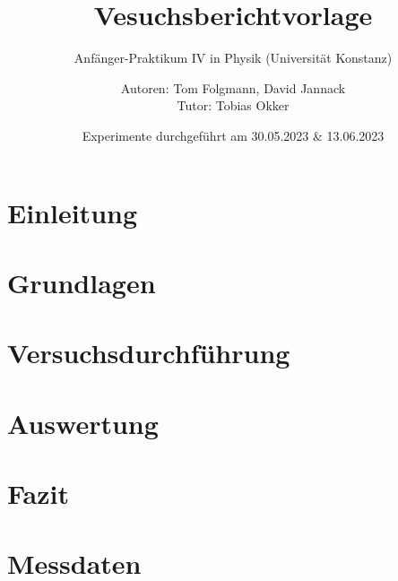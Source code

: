 \documentclass[
    oneside, 
    footinclude=off, 
    captions=tableheading, 
    DIV=12;usenames,
    dvipsnames
]{scrartcl}
\begin{document}
    \title{Vesuchsberichtvorlage}
    \subtitle{Anfänger-Praktikum IV in Physik (Universität Konstanz)}
    \author{Autoren: Tom Folgmann, David Jannack \\ \large{Tutor: Tobias Okker}}
    \date{Experimente durchgeführt am 30.05.2023 \& 13.06.2023}
    \maketitle
    \thispagestyle{empty}
    \section*{Einleitung}
        

    \newpage


    \tableofcontents
    \thispagestyle{empty}	
    \newpage
    \setcounter{page}{1}


\newpage
\section{Grundlagen}
    
    
	

\newpage
\section{Versuchsdurchführung}
    

\newpage
\section{Auswertung}
    

\newpage
\section{Fazit}
    


\newpage
    
\newpage
    \listoffigures
    \listoftables


\newpage
    \section*{Messdaten}
    
\newpage
    



%
\end{document}
